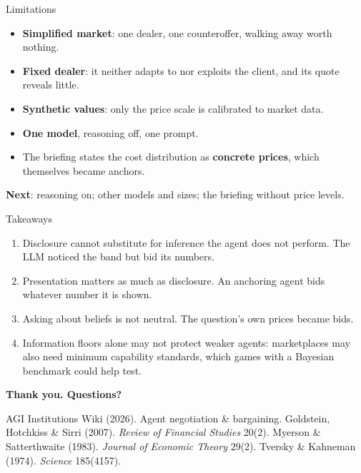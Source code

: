 \documentclass[aspectratio=169,11pt]{beamer}
\begin{document}
\begin{frame}{Limitations}
  \begin{itemize}
    \item \textbf{Simplified market}: one dealer, one counteroffer, walking away worth nothing.
    \item \textbf{Fixed dealer}: it neither adapts to nor exploits the client, and its quote reveals little.
    \item \textbf{Synthetic values}: only the price scale is calibrated to market data.
    \item \textbf{One model}, reasoning off, one prompt.
    \item The briefing states the cost distribution as \textbf{concrete prices}, which themselves became anchors.
  \end{itemize}
  \vspace{0.5em}
  \textbf{Next}: reasoning on; other models and sizes; the briefing without price levels.
\end{frame}

\begin{frame}{Takeaways}
  \begin{enumerate}
    \item \alert{Disclosure cannot substitute for inference the agent does not perform.} The LLM noticed the band but bid its numbers.
    \item \alert{Presentation matters as much as disclosure.} An anchoring agent bids whatever number it is shown.
    \item \alert{Asking about beliefs is not neutral.} The question's own prices became bids.
    \item Information floors alone may not protect weaker agents: marketplaces may also need \alert{minimum capability standards}, which games with a Bayesian benchmark could help test.
  \end{enumerate}
  \vfill
  \begin{center}\textcolor{accent}{\textbf{Thank you. Questions?}}\end{center}
  \vspace{0.3em}
  \raggedright\tiny\textcolor{muted}{
  AGI Institutions Wiki (2026). Agent negotiation \& bargaining. \quad
  Goldstein, Hotchkiss \& Sirri (2007). \textit{Review of Financial Studies} 20(2). \quad
  Myerson \& Satterthwaite (1983). \textit{Journal of Economic Theory} 29(2). \quad
  Tversky \& Kahneman (1974). \textit{Science} 185(4157).}
\end{frame}
\end{document}

